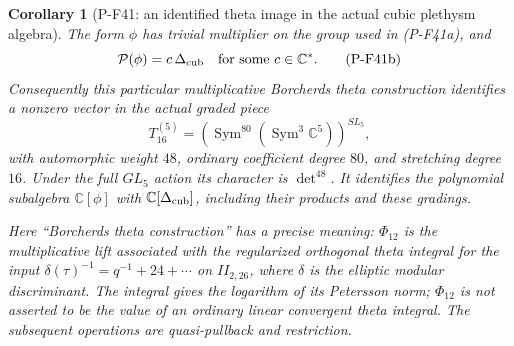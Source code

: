 \documentclass[11pt,a4paper]{article}
\newtheorem{corollary}[proposition]{Corollary}
\begin{document}
\begin{corollary}[P-F41: an identified theta image in the actual cubic plethysm algebra]
\label{cor:thetadiscriminant}
The form $\phi$ has trivial multiplier on the group used in
(P-F41a), and
\[
             \mathcal P(\phi)=c\,\Delta_{\rm cub}
             \quad\text{for some }c\in\mathbb C^*.
 \tag{P-F41b}
\]
Consequently this particular multiplicative Borcherds theta
construction identifies a nonzero vector in the actual graded piece
\[
 T^{(5)}_{16}
    =\left(\operatorname{Sym}^{80}
                    (\operatorname{Sym}^3\mathbb C^5)\right)^{SL_5},
 \tag{P-F41c}
\]
with automorphic weight $48$, ordinary coefficient degree $80$,
and stretching degree $16$. Under the full $GL_5$ action its
character is $\det^{48}$. It identifies the polynomial subalgebra
$\mathbb C[\phi]$ with $\mathbb C[\Delta_{\rm cub}]$,
including their products and these gradings.

Here ``Borcherds theta construction'' has a precise meaning:
$\Phi_{12}$ is the multiplicative lift associated with the
regularized orthogonal theta integral for the input
$\delta(\tau)^{-1}=q^{-1}+24+\cdots$ on $II_{2,26}$,
where $\delta$ is the elliptic modular discriminant.
The integral gives the logarithm of its Petersson norm;
$\Phi_{12}$ is not asserted to be the value of an ordinary
linear convergent theta integral. The subsequent operations
are quasi-pullback and restriction.
\end{corollary}
\end{document}
